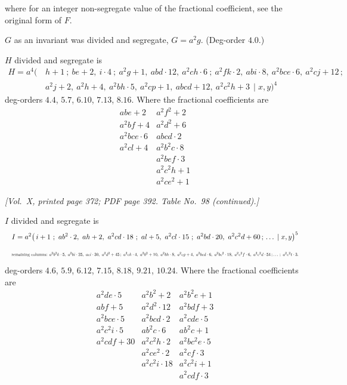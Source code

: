 \documentclass[11pt]{article}
\begin{document}
\medskip

where for an integer non-segregate value of the fractional coefficient, see the original form of $F$.

\medskip

\noindent$G$ as an invariant was divided and segregate, $G=a^{2}g$. (Deg-order $4.0$.)

\medskip

\noindent$H$ divided and segregate is
\begin{align*}
H=a^{4}\bigl(\,&h+1\ ;\ be+2,\ i\cdot 4\ ;\ a^{2}g+1,\ abd\cdot 12,\ a^{2}ch\cdot 6\ ;\ a^{2}fk\cdot 2,\ abi\cdot 8,\ a^{2}bce\cdot 6,\ a^{2}cj+12\,;\\
&a^{2}j+2,\ a^{2}h+4,\ a^{2}bh\cdot 5,\ a^{2}cp+1,\ abcd+12,\ a^{2}c^{2}h+3\,\mid x,y\bigr)^{4}
\end{align*}
deg-orders $4.4$, $5.7$, $6.10$, $7.13$, $8.16$. Where the fractional coefficients are
\[
\begin{array}{l|l}
abe+2 & a^{2}f^{2}+2 \\
a^{2}bf+4 & a^{2}d^{2}+6 \\
a^{2}bce\cdot 6 & abcd\cdot 2 \\
a^{2}cl+4 & a^{2}b^{2}c\cdot 8 \\
 & a^{2}bef\cdot 3 \\
 & a^{2}c^{2}h+1 \\
 & a^{2}ce^{2}+1
\end{array}
\]

\newpage

\noindent\textit{[Vol.~X, printed page 372; PDF page 392. Table No.~98 (continued).]}

\medskip

\noindent$I$ divided and segregate is
\[
\resizebox{\textwidth}{!}{$\displaystyle
I=a^{2}\bigl(\,i+1\ ;\ ab^{2}\cdot 2,\ ah+2,\ a^{2}cd\cdot 18\ ;\ al+5,\ a^{2}cl\cdot 15\ ;\ a^{2}bd\cdot 20,\ a^{2}c^{2}d+60\,;\,\ldots\,\mid x,y\bigr)^{5}
$}
\]
\[
\resizebox{\textwidth}{!}{$\displaystyle
\text{remaining columns: }a^{2}b^{2}k\cdot 5,\ a^{2}bi\cdot 25,\ aci\cdot 30,\ a^{2}d^{2}+45\,;\ a^{2}ck\cdot 4,\ a^{2}b^{2}+10,\ a^{2}bh\cdot 8,\ a^{2}cg+4,\ a^{2}bcd\cdot 6,\ a^{2}bc^{2}\cdot 18,\ a^{2}c^{2}f\cdot 6,\ a^{2}c^{2}d\cdot 54\,;\ldots\,;\ a^{2}c^{2}t\cdot 3.
$}
\]
deg-orders $4.6$, $5.9$, $6.12$, $7.15$, $8.18$, $9.21$, $10.24$. Where the fractional coefficients are
\[
\begin{array}{l|l|l}
a^{2}de\cdot 5 & a^{2}b^{2}+2 & a^{2}b^{2}e+1 \\
abf+5 & a^{2}d^{2}\cdot 12 & a^{2}bdf+3 \\
a^{2}bce\cdot 5 & a^{2}bcd\cdot 2 & a^{2}cde\cdot 5 \\
a^{2}c^{2}i\cdot 5 & ab^{2}c\cdot 6 & ab^{2}c+1 \\
a^{2}cdf+30 & a^{2}c^{2}h\cdot 2 & a^{2}bc^{2}e\cdot 5 \\
 & a^{2}ce^{2}\cdot 2 & a^{2}cf\cdot 3 \\
 & a^{2}c^{2}i\cdot 18 & a^{2}c^{2}i+1 \\
 & & a^{2}cdf\cdot 3
\end{array}
\]
\end{document}
